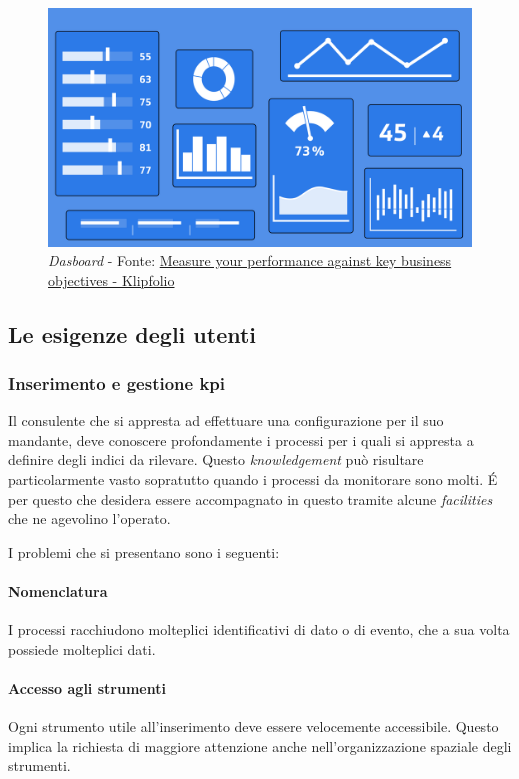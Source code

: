 \begin{figure}[H]
    \centering
    \includegraphics[width=0.80\columnwidth]{immagini/dashboard.png}
    \caption{\textit{Dasboard} - Fonte: \href{https://www.klipfolio.com/resources/articles/what-is-a-key-performance-indicator}{Measure your performance against key business objectives - Klipfolio}}
    \label{fig:dashboard}
\end{figure}
\subsection{Le esigenze degli utenti}
\subsubsection{Inserimento e gestione \acrshort{kpi}}
Il consulente che si appresta ad effettuare una configurazione per il suo mandante, deve conoscere profondamente i processi per i quali si appresta a definire degli indici da rilevare. Questo \textit{knowledgement} può risultare particolarmente vasto sopratutto quando i processi da monitorare sono molti. \'E per questo che desidera essere accompagnato in questo tramite alcune \textit{facilities} che ne agevolino l'operato.

I problemi che si presentano sono i seguenti:
\paragraph{Nomenclatura} I processi racchiudono molteplici identificativi di dato o di evento, che a sua volta possiede molteplici dati.
\paragraph{Accesso agli strumenti} Ogni strumento utile all'inserimento deve essere velocemente accessibile. Questo implica la richiesta di maggiore attenzione anche nell'organizzazione spaziale degli strumenti.
